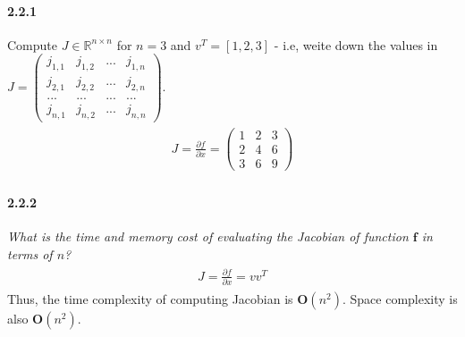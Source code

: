 \documentclass{myhw}
\begin{document}
\begin{homeworkProblem}
\begin{homeworkSection}
\paragraph{2.2.1}
Compute $J \in \mathbb{R}^{n\times n}$ for $n=3$ and $v^T=[1,2,3]$ - i.e, weite down the values in $J=\begin{pmatrix} j_{1,1} & j_{1,2} & ... & j_{1,n}\\ j_{2,1} & j_{2,2} & ... & j_{2,n}\\ ... & ... & ... & ... \\ j_{n,1} & j_{n,2} & ... & j_{n,n} \end{pmatrix}$. 
\begin{gather*}
\begin{aligned}
J = \frac{\partial f}{\partial x} =\begin{pmatrix} 1 & 2 & 3 \\ 2 & 4 & 6 \\ 3 & 6 & 9 \end{pmatrix}
\end{aligned}
\end{gather*}
\paragraph{2.2.2}
\emph{What is the time and memory cost of evaluating the Jacobian of function $\textbf{f}$ in terms of $n$?}
\begin{gather*}
\begin{aligned}
J = \frac{\partial f}{\partial x} = v v^T
\end{aligned}
\end{gather*}
Thus, the time complexity of computing Jacobian is $\textbf{O}(n^2)$. 
Space complexity is also $\textbf{O}(n^2)$. 

\end{homeworkSection}
\end{homeworkProblem}
\end{document}
